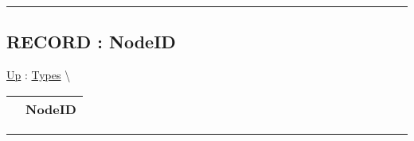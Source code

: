 \par


\rule{\linewidth}{0.5pt}
\subsection*{RECORD : NodeID}
\hypertarget{ecldoc:ml_core.types.nodeid}{}
\hyperlink{ecldoc:ML_Core.Types}{Up} :
\hspace{0pt} \hyperlink{ecldoc:ML_Core.Types}{Types} \textbackslash 

{\renewcommand{\arraystretch}{1.5}
\begin{tabularx}{\textwidth}{|>{\raggedright\arraybackslash}l|X|}
\hline
\hspace{0pt} & NodeID \\
\hline
\end{tabularx}
}

\par


\rule{\linewidth}{0.5pt}


